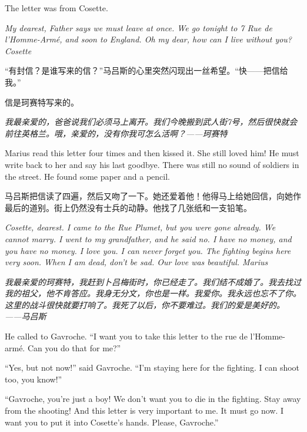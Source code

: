 \documentclass[fontset=ubuntu, zihao=5]{ctexart}
\begin{document}
\begin{paracol}{2}
The letter was from Cosette.

\emph{My dearest, Father says we must leave at once. We go tonight to 7 Rue de l'Homme-Armé, and soon to England. Oh my dear, how can I live without you? Cosette}

\switchcolumn

“有封信？是谁写来的信？”马吕斯的心里突然闪现出一丝希望。“快——把信给我。”

信是珂赛特写来的。

\emph{我最亲爱的，爸爸说我们必须马上离开。我们今晚搬到武人街7号，然后很快就会
  前往英格兰。哦，亲爱的，没有你我可怎么活啊？——珂赛特}

\switchcolumn*

Marius read this letter four times and then kissed it. She still loved him! He must write back to her and say his last goodbye. There was still no sound of soldiers in the street. He found some paper and a pencil.

\switchcolumn

马吕斯把信读了四遍，然后又吻了一下。她还爱着他！他得马上给她回信，向她作最后的道别。街上仍然没有士兵的动静。他找了几张纸和一支铅笔。

\switchcolumn*

\emph{Cosette, dearest. I came to the Rue Plumet, but you were gone already. We cannot marry. I went to my grandfather, and he said no. I have no money, and you have no money. I love you. I can never forget you. The fighting begins here very soon. When I am dead, don't be sad. Our love was beautiful. Marius}

\switchcolumn

\emph{我最亲爱的珂赛特，我赶到卜吕梅街时，你已经走了。我们结不成婚了。我去找过我的祖父，他不肯答应。我身无分文，你也是一样。我爱你。我永远也忘不了你。这里的战斗很快就要打响了。我死了以后，你不要难过。我们的爱是美好的。——马吕斯}

\switchcolumn*

He called to Gavroche. ``I want you to take this letter to the rue de l'Homme-armé. Can you do that for me?''

``Yes, but not now!'' said Gavroche. ``I'm staying here for the fighting. I can shoot too, you know!''

``Gavroche, you're just a boy! We don't want you to die in the fighting. Stay
away from the shooting! And this letter is very important to me. It must go
now. I want you to put it into Cosette's hands. Please, Gavroche.''

\switchcolumn


\end{paracol}
\end{document}
